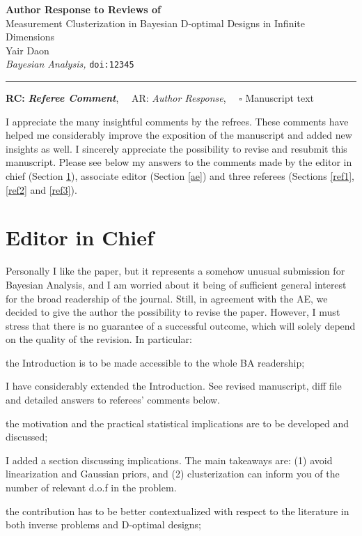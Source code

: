 \documentclass{article}
\def\papertitle{Measurement Clusterization in Bayesian D-optimal Designs in Infinite Dimensions}
\def\authors{Yair Daon}
\def\journal{Bayesian Analysis}
\def\doi{12345}
\providecommand{\lettertitle}{Author Response to Reviews of}
\providecommand{\papertitle}{Title}
\providecommand{\authors}{Authors}
\providecommand{\journal}{Journal}
\providecommand{\doi}{--}
\begin{document}
{\Large\bf \lettertitle}\\[1em]
{\huge \papertitle}\\[1em]
{\authors}\\
{\it \journal, }\texttt{doi:\doi}\\
\hrule

\hfill {\bfseries RC:} \textbf{\textit{Referee Comment}},\(\quad\) AR: \emph{Author Response}, \(\quad\square\) Manuscript text

I appreciate the many insightful comments by the refrees. These
comments have helped me considerably improve the exposition of the
manuscript and added new insights as well. I sincerely appreciate the
possibility to revise and resubmit this manuscript. Please see below
my answers to the comments made by the editor in chief (Section
\ref{eic}), associate editor (Section \ref{ae}) and three referees
(Sections \ref{ref1}, \ref{ref2} and \ref{ref3}).



\section{Editor in Chief}\label{eic}
\RC Personally I like the paper, but it represents a somehow unusual
submission for Bayesian Analysis, and I am worried about it being of
sufficient general interest for the broad readership of the
journal. Still, in agreement with the AE, we decided to give the
author the possibility to revise the paper. However, I must stress
that there is no guarantee of a successful outcome, which will solely
depend on the quality of the revision. In particular:

\RC the Introduction is to be made accessible to the whole BA
    readership;
    
\AR I have considerably extended the Introduction. See revised
manuscript, diff file and detailed answers to referees' comments
below.
   
    
\RC the motivation and the practical statistical implications are to
be developed and discussed;

\AR I added a section discussing implications. The main takeaways are:
(1) avoid linearization and Gaussian priors, and (2) clusterization
can inform you of the number of relevant d.o.f in the problem.
   
    
\RC the contribution has to be better contextualized with respect to
the literature in both inverse problems and D-optimal designs;
\end{document}
